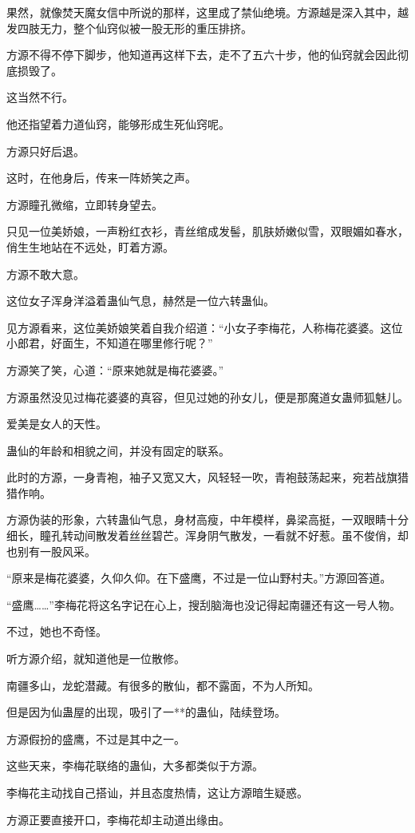 \begin{this_body}
果然，就像焚天魔女信中所说的那样，这里成了禁仙绝境。方源越是深入其中，越发四肢无力，整个仙窍似被一股无形的重压排挤。

方源不得不停下脚步，他知道再这样下去，走不了五六十步，他的仙窍就会因此彻底损毁了。

这当然不行。

他还指望着力道仙窍，能够形成生死仙窍呢。

方源只好后退。

这时，在他身后，传来一阵娇笑之声。

方源瞳孔微缩，立即转身望去。

只见一位美娇娘，一声粉红衣衫，青丝绾成发髻，肌肤娇嫩似雪，双眼媚如春水，俏生生地站在不远处，盯着方源。

方源不敢大意。

这位女子浑身洋溢着蛊仙气息，赫然是一位六转蛊仙。

见方源看来，这位美娇娘笑着自我介绍道：“小女子李梅花，人称梅花婆婆。这位小郎君，好面生，不知道在哪里修行呢？”

方源笑了笑，心道：“原来她就是梅花婆婆。”

方源虽然没见过梅花婆婆的真容，但见过她的孙女儿，便是那魔道女蛊师狐魅儿。

爱美是女人的天性。

蛊仙的年龄和相貌之间，并没有固定的联系。

此时的方源，一身青袍，袖子又宽又大，风轻轻一吹，青袍鼓荡起来，宛若战旗猎猎作响。

方源伪装的形象，六转蛊仙气息，身材高瘦，中年模样，鼻梁高挺，一双眼睛十分细长，瞳孔转动间散发着丝丝碧芒。浑身阴气散发，一看就不好惹。虽不俊俏，却也别有一股风采。

“原来是梅花婆婆，久仰久仰。在下盛鹰，不过是一位山野村夫。”方源回答道。

“盛鹰……”李梅花将这名字记在心上，搜刮脑海也没记得起南疆还有这一号人物。

不过，她也不奇怪。

听方源介绍，就知道他是一位散修。

南疆多山，龙蛇潜藏。有很多的散仙，都不露面，不为人所知。

但是因为仙蛊屋的出现，吸引了一**的蛊仙，陆续登场。

方源假扮的盛鹰，不过是其中之一。

这些天来，李梅花联络的蛊仙，大多都类似于方源。

李梅花主动找自己搭讪，并且态度热情，这让方源暗生疑惑。

方源正要直接开口，李梅花却主动道出缘由。


\end{this_body}
